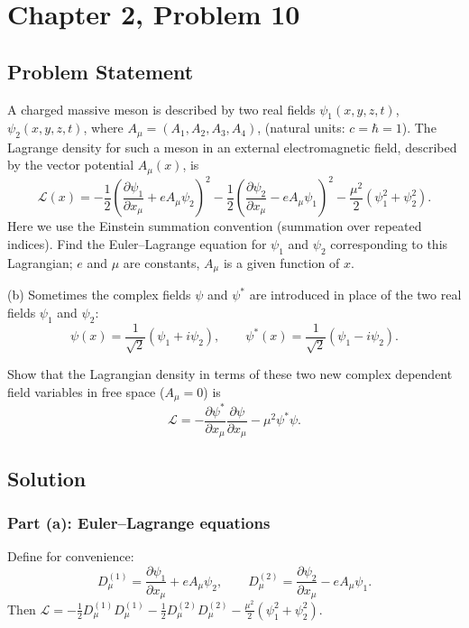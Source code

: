\documentclass[12pt]{article}
\begin{document}
\section*{Chapter 2, Problem 10}

\subsection*{Problem Statement}
A charged massive meson is described by two real fields $\psi_1(x,y,z,t)$, $\psi_2(x,y,z,t)$, where $A_\mu = (A_1, A_2, A_3, A_4)$, (natural units: $c = \hbar = 1$). The Lagrange density for such a meson in an external electromagnetic field, described by the vector potential $A_\mu(x)$, is
\[
  \mathscr{L}(x) = -\frac{1}{2}\left(\frac{\partial\psi_1}{\partial x_\mu} + eA_\mu\psi_2\right)^2 - \frac{1}{2}\left(\frac{\partial\psi_2}{\partial x_\mu} - eA_\mu\psi_1\right)^2 - \frac{\mu^2}{2}(\psi_1^2 + \psi_2^2).
\]
Here we use the Einstein summation convention (summation over repeated indices). Find the Euler--Lagrange equation for $\psi_1$ and $\psi_2$ corresponding to this Lagrangian; $e$ and $\mu$ are constants, $A_\mu$ is a given function of $x$.

\noindent (b) Sometimes the complex fields $\psi$ and $\psi^*$ are introduced in place of the two real fields $\psi_1$ and $\psi_2$:
\[
  \psi(x) = \frac{1}{\sqrt{2}}(\psi_1 + i\psi_2), \qquad
  \psi^*(x) = \frac{1}{\sqrt{2}}(\psi_1 - i\psi_2).
\]

Show that the Lagrangian density in terms of these two new complex dependent field variables in free space ($A_\mu = 0$) is
\[
  \mathscr{L} = -\frac{\partial\psi^*}{\partial x_\mu}\frac{\partial\psi}{\partial x_\mu} - \mu^2\psi^*\psi.
\]

\subsection*{Solution}

\subsubsection*{Part (a): Euler--Lagrange equations}

Define for convenience:
\[
  D_\mu^{(1)} = \frac{\partial\psi_1}{\partial x_\mu} + eA_\mu\psi_2,
  \qquad
  D_\mu^{(2)} = \frac{\partial\psi_2}{\partial x_\mu} - eA_\mu\psi_1.
\]
Then $\mathscr{L} = -\frac{1}{2}D_\mu^{(1)}D_\mu^{(1)} - \frac{1}{2}D_\mu^{(2)}D_\mu^{(2)} - \frac{\mu^2}{2}(\psi_1^2+\psi_2^2)$.
\end{document}
